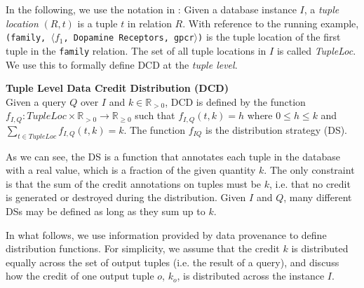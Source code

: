 In the following, we use the notation in \citet{CheneyProvSurvey}: Given a database instance $I$, a \emph{tuple location} $(R, t)$ is a tuple $t$ in  relation $R$. With reference to the running example, \texttt{(family, $\langle f_1$, Dopamine Receptors, gpcr$\rangle$)} is the tuple location of the first tuple in the \texttt{family} relation.  The set of all tuple locations in $I$ is called \emph{TupleLoc}.  We use this to formally define DCD at the \emph{tuple level}.


\begin{definition}
    \textbf{Tuple Level Data Credit Distribution (DCD)}~\citep{dosso2020data}
    \label{def:CDT}\\
    Given a query $Q$ over $I$ and $k \in \mathbb{R}_{>0}$, {DCD} is defined by the 
    function $f_{I, Q} : TupleLoc \times \mathbb{R}_{> 0} \rightarrow \mathbb{R}_{\geq0}$ such that $f_{I,Q}(t, k)=h$ where $0 \leq h \leq k$ and $\sum_{t \in TupleLoc}f_{I, Q}(t, k) = k$.  The function $f_{I Q}$ is the distribution strategy (DS).
\end{definition}

As we can see, the DS is a function that annotates each tuple in the database with a real value, which is a fraction of the given quantity $k$. The only constraint is that the sum of the credit annotations on tuples must be $k$, i.e. that no credit is generated or destroyed during the distribution.
Given $I$ and $Q$, many different DSs may be defined as long as they sum up to $k$. 

In what follows, we use information provided by data provenance to define distribution functions.
For simplicity, we assume that the credit $k$ is distributed equally across the set of output tuples (i.e. the result of a query), and discuss how the credit of one output tuple $o$, $k_o$, is distributed across the instance $I$.


